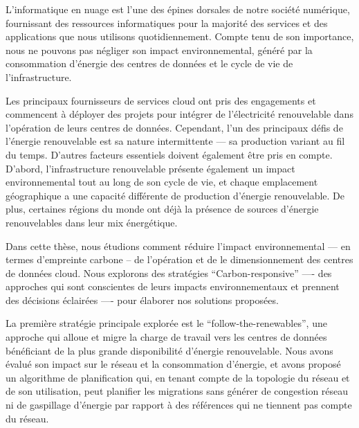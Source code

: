 
L'informatique en nuage est l'une des épines dorsales de notre société numérique, fournissant des ressources informatiques pour la majorité des services et des applications que nous utilisons quotidiennement. Compte tenu de son importance, nous ne pouvons pas négliger son impact environnemental, généré par la consommation d'énergie des centres de données et le cycle de vie de l'infrastructure.

Les principaux fournisseurs de services cloud ont pris des engagements et commencent à déployer des projets pour intégrer de l'électricité renouvelable dans l'opération de leurs centres de données. Cependant, l'un des principaux défis de l'énergie renouvelable est sa nature intermittente --- sa production variant au fil du temps. D'autres facteurs essentiels doivent également être pris en compte. D'abord, l'infrastructure renouvelable présente également un impact environnemental tout au long de son cycle de vie, et chaque emplacement géographique a une capacité différente de production d'énergie renouvelable. De plus, certaines régions du monde ont déjà la présence de sources d'énergie renouvelables dans leur mix énergétique.

Dans cette thèse, nous étudions comment réduire l'impact environnemental --- en termes d'empreinte carbone -- de l'opération et de le dimensionnement des centres de données cloud. Nous explorons des stratégies ``Carbon-responsive'' ---- des approches qui sont conscientes de leurs impacts environnementaux et prennent des décisions éclairées ---- pour élaborer nos solutions proposées.



La première stratégie principale explorée est le  ``follow-the-renewables'', une approche qui alloue et migre la charge de travail vers les centres de données bénéficiant de la plus grande disponibilité d'énergie renouvelable. Nous avons évalué son impact sur le réseau et la consommation d'énergie, et avons proposé un algorithme de planification qui, en tenant compte de la topologie du réseau et de son utilisation, peut planifier les migrations sans générer de congestion réseau ni de gaspillage d'énergie par rapport à des références qui ne tiennent pas compte du réseau.




